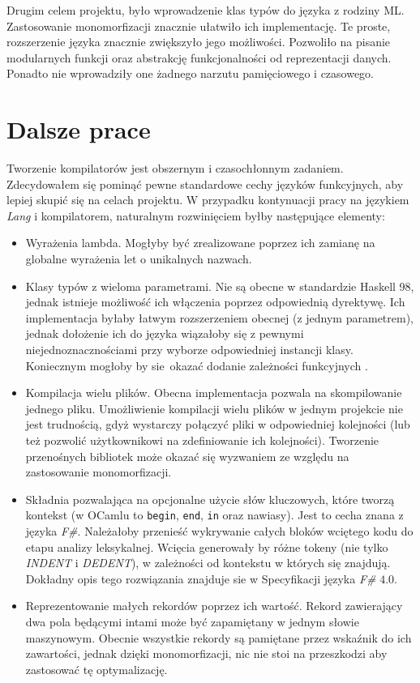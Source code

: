 \documentclass[declaration,shortabstract]{iithesis}
\begin{document}
Drugim celem projektu, było wprowadzenie klas typów do języka z rodziny ML. 
Zastosowanie monomorfizacji znacznie ułatwiło ich implementację. Te proste,
rozszerzenie języka znacznie zwiększyło jego możliwości. Pozwoliło na 
pisanie modularnych funkcji oraz abstrakcję funkcjonalności od reprezentacji 
danych. Ponadto nie wprowadziły one żadnego narzutu pamięciowego i czasowego.

\section{Dalsze prace}

Tworzenie kompilatorów jest obszernym i czasochłonnym zadaniem. Zdecydowałem 
się pominąć pewne standardowe cechy języków funkcyjnych, aby lepiej skupić 
się na celach projektu. W przypadku kontynuacji pracy na językiem \textit{Lang}
i kompilatorem, naturalnym rozwinięciem byłby następujące elementy:

\begin{itemize}
  \item Wyrażenia lambda. Mogłyby być zrealizowane poprzez ich zamianę na 
  globalne wyrażenia let o unikalnych nazwach. 
  \item Klasy typów z wieloma parametrami. Nie są obecne w standardzie 
  Haskell 98, jednak istnieje możliwość ich włączenia poprzez odpowiednią 
  dyrektywę. Ich implementacja byłaby łatwym 
  rozszerzeniem obecnej (z jednym parametrem), jednak dołożenie ich do języka 
  wiązałoby się z pewnymi niejednoznacznościami \cite{multi_params_tcs}
  przy wyborze odpowiedniej instancji klasy. Koniecznym mogłoby by sie okazać 
  dodanie zależności funkcyjnych \cite{fun_deps}.
  \item Kompilacja wielu plików. Obecna implementacja pozwala na skompilowanie 
  jednego pliku. Umożliwienie kompilacji wielu plików w jednym projekcie nie 
  jest trudnością, gdyż wystarczy połączyć pliki w odpowiedniej kolejności 
  (lub też pozwolić użytkownikowi na zdefiniowanie ich kolejności). Tworzenie 
  przenośnych bibliotek może okazać się wyzwaniem ze względu na zastosowanie 
  monomorfizacji.
  \item Składnia pozwalająca na opcjonalne użycie słów kluczowych, które tworzą 
  kontekst (w OCamlu to \texttt{begin}, \texttt{end}, \texttt{in} oraz nawiasy).
  Jest to cecha znana z języka \textit{F\#}. Należałoby przenieść wykrywanie 
  całych bloków wciętego kodu do etapu analizy leksykalnej. Wcięcia generowały 
  by różne tokeny (nie tylko \textit{INDENT} i \textit{DEDENT}), w zależności 
  od kontekstu w których się znajdują. Dokładny opis tego rozwiązania znajduje 
  sie w Specyfikacji języka \textit{F\#} $4.0$\cite{fs_spec}.
  \item Reprezentowanie małych rekordów poprzez ich wartość. Rekord zawierający 
  dwa pola będącymi intami może być zapamiętany w jednym słowie maszynowym. 
  Obecnie wszystkie rekordy są pamiętane przez wskaźnik do ich zawartości, 
  jednak dzięki monomorfizacji, nic nie stoi na przeszkodzi aby zastosować tę 
  optymalizację.

\end{itemize}
\end{document}
